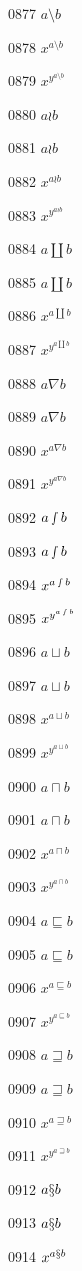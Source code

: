 \documentclass{article}
\begin{document}
0877 $\displaystyle a\setminus b$\par
0878 $x^{a\setminus b}$\par
0879 $x^{y^{a\setminus b}}$\par
0880 $a\wr b$\par
0881 $\displaystyle a\wr b$\par
0882 $x^{a\wr b}$\par
0883 $x^{y^{a\wr b}}$\par
0884 $a\amalg b$\par
0885 $\displaystyle a\amalg b$\par
0886 $x^{a\amalg b}$\par
0887 $x^{y^{a\amalg b}}$\par
0888 $a\nabla b$\par
0889 $\displaystyle a\nabla b$\par
0890 $x^{a\nabla b}$\par
0891 $x^{y^{a\nabla b}}$\par
0892 $a\smallint b$\par
0893 $\displaystyle a\smallint b$\par
0894 $x^{a\smallint b}$\par
0895 $x^{y^{a\smallint b}}$\par
0896 $a\sqcup b$\par
0897 $\displaystyle a\sqcup b$\par
0898 $x^{a\sqcup b}$\par
0899 $x^{y^{a\sqcup b}}$\par
0900 $a\sqcap b$\par
0901 $\displaystyle a\sqcap b$\par
0902 $x^{a\sqcap b}$\par
0903 $x^{y^{a\sqcap b}}$\par
0904 $a\sqsubseteq b$\par
0905 $\displaystyle a\sqsubseteq b$\par
0906 $x^{a\sqsubseteq b}$\par
0907 $x^{y^{a\sqsubseteq b}}$\par
0908 $a\sqsupseteq b$\par
0909 $\displaystyle a\sqsupseteq b$\par
0910 $x^{a\sqsupseteq b}$\par
0911 $x^{y^{a\sqsupseteq b}}$\par
0912 $a\mathsection b$\par
0913 $\displaystyle a\mathsection b$\par
0914 $x^{a\mathsection b}$\par
\end{document}
